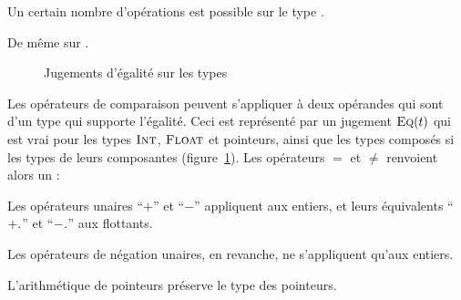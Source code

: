 Un certain nombre d'opérations est possible sur le type \tInt.

\begin{mathpar}
\end{mathpar}

De même sur \tFloat.

\begin{mathpar}
\end{mathpar}

\begin{figure}


  \begin{mathpar}



  \end{mathpar}

\caption{Jugements d'égalité sur les types}
\label{fig:jugement-eq}
\end{figure}

Les opérateurs de comparaison peuvent s'appliquer à deux opérandes qui sont d'un
type qui supporte l'égalité. Ceci est représenté par un jugement
$\textsc{Eq}(t)$ qui est vrai pour les types $\tInt$, $\tFloat$ et pointeurs,
ainsi que les types composés si les types de leurs composantes
(figure~\ref{fig:jugement-eq}). Les opérateurs $=$ et $≠$ renvoient alors un
\tInt:

\begin{mathpar}
\end{mathpar}

Les opérateurs unaires ``$+$'' et ``$-$'' appliquent aux entiers, et leurs
équivalents ``$\floatop{+}$'' et ``$\floatop{-}$'' aux flottants.


Les opérateurs de négation unaires, en revanche, ne s'appliquent qu'aux
entiers.

\begin{mathpar}
\end{mathpar}

L'arithmétique de pointeurs préserve le type des pointeurs.

